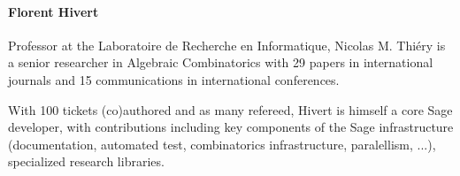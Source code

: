 \paragraph{Florent Hivert}

%

%



Professor at the Laboratoire de Recherche en Informatique, Nicolas
M. Thiéry is a senior researcher in Algebraic Combinatorics with 29 papers in
international journals and 15 communications in international conferences.

With 100 tickets (co)authored and as many refereed, Hivert is himself a core
Sage developer, with contributions including key components of the Sage
infrastructure (documentation, automated test, combinatorics infrastructure,
paralellism, ...), specialized research libraries.

